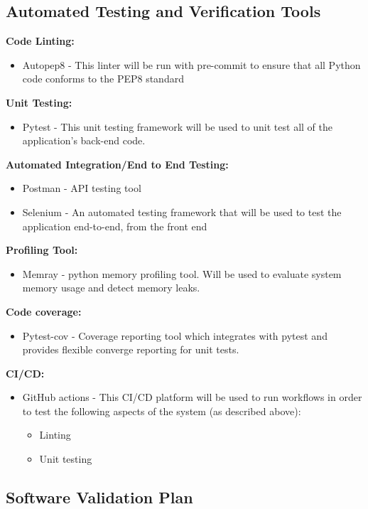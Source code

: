 \documentclass[12pt, titlepage]{article}
\begin{document}
\subsection{Automated Testing and Verification Tools}

\textbf{Code Linting:}
\begin{itemize}
    \item Autopep8 - This linter will be run with pre-commit to ensure that all Python code conforms to the PEP8 standard
\end{itemize}
\textbf{Unit Testing:}
\begin{itemize}
    \item Pytest - This unit testing framework will be used to unit test all of the application’s back-end code.
\end{itemize}
\textbf{Automated Integration/End to End Testing:}
\begin{itemize}
    \item Postman - API testing tool
    \item Selenium - An automated testing framework that will be used to test the application end-to-end, from the front end
\end{itemize}
\textbf{Profiling Tool:}
\begin{itemize}
    \item Memray - python memory profiling tool. Will be used to evaluate system memory usage and detect memory leaks.
\end{itemize}
\textbf{Code coverage:}
\begin{itemize}
    \item Pytest-cov - Coverage reporting tool which integrates with pytest and provides flexible converge reporting for unit tests.
\end{itemize}
\textbf{CI/CD:}
\begin{itemize}
    \item GitHub actions - This CI/CD platform will be used to run workflows in order to test the following aspects of the system (as described above):
    \begin{itemize}
        \item Linting
        \item Unit testing
    \end{itemize}
\end{itemize}


\subsection{Software Validation Plan}
\end{document}
